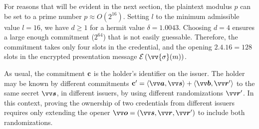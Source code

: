 For reasons that will be evident in the next section, the plaintext modulus $p$ can be set to a prime number $p\approx O(2^{16})$. Setting $l$ to the minimum admissible value $l=16$, we have $d\ge 1$ for a hermit value $\delta=1.0043$. Choosing $d=4$ ensures a large enough commitment ($2^{64}$) that is not easily guessable. Therefore, the commitment takes only four slots in the credential, and the opening $2.4.16=128$ slots in the encrypted presentation message $\enc{\vv{\sigma}(m)}$. 

As usual, the commitment $\mathbf{c}$ is the holder's identifier on the issuer. The holder may be known by different commitments $\pc'=\inprod{\pv{a}}{\pv{s}}+\inprod{\pv{b}}{\pv{r}'}$ to the same secret $\pv{s}$, in different issuers, by using different randomizations $\pv{r}'$. In this context, proving the ownership of two credentials from different issuers requires only extending the opener $\pv{o}=(\pv{s},\pv{r},\pv{r}')$ to include both randomizations.
